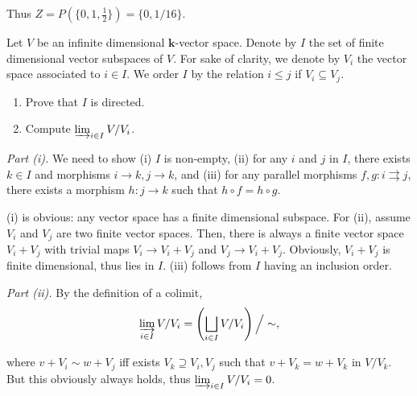 \documentclass{category-template}
\begin{document}
Thus $Z=P(\{0,1,\frac{1}{2}\})=\{0,1/16\}$.

\begin{problem}
    Let $V$ be an infinite dimensional $\mathbf{k}$-vector space. Denote by 
    $I$ the set of finite dimensional vector subspaces of $V$. For sake of 
    clarity, we denote by $V_i$ the vector space associated to $i \in I$.
    We order $I$ by the relation $i \leq j$ if $V_i \subseteq V_j$.
    \begin{enumerate}
        \item[(i)] Prove that $I$ is directed.
        \item[(ii)] Compute $\varinjlim_{i \in I} V/V_i$. 
    \end{enumerate}
\end{problem}

\textit{Part (i).} We need to show (i) $I$ is non-empty, (ii) for any $i$ and
$j$ in $I$, there exists $k \in I$ and morphisms $i \to k, j \to k$, and (iii)
for any parallel morphisms $f,g: i \rightrightarrows j$, there exists a morphism
$h: j \to k$ such that $h \circ f = h \circ g$.

(i) is obvious: any vector space has a finite dimensional subspace. For (ii),
assume $V_i$ and $V_j$ are two finite vector spaces. Then, there is always a
finite vector space $V_i + V_j$ with trivial maps $V_i \to V_i + V_j$ and $V_j
\to V_i + V_j$. Obviously, $V_i + V_j$ is finite dimensional, thus lies in $I$.
(iii) follows from $I$ having an inclusion order.

\textit{Part (ii).} By the definition of a colimit,
\begin{equation*}
    \varinjlim_{i \in I} V/V_i = \left(\bigsqcup_{i \in I}V/V_i\right) \Big/ \sim,
\end{equation*}

where $v+V_i \sim w+V_j$ iff exists $V_k \supseteq V_i,V_j$ such that
$v+V_k=w+V_k$ in $V/V_k$. But this obviously always holds, thus $\varinjlim_{i
\in I} V/V_i=0$.
\end{document}
